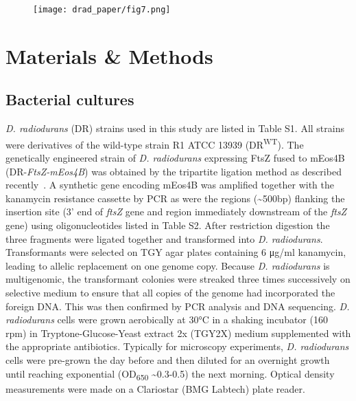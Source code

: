 \begin{figure}[ht]
    \centering
    \texttt{[image: drad\_paper/fig7.png]}
    \label{drad_fig7}
\end{figure}

\section{Materials \& Methods}

\subsection{Bacterial cultures}

\textit{D. radiodurans} (DR) strains used in this study are listed in Table S1.
All strains were derivatives of the wild-type strain R1 ATCC 13939 (DR\textsuperscript{WT}).
The genetically engineered strain of \textit{D. radiodurans} expressing FtsZ fused to mEos4B (DR-\textit{FtsZ-mEos4B}) was obtained by the tripartite ligation method as described recently~\cite{vauclareStressinducedNucleoidRemodeling2024}.
A synthetic gene encoding mEos4B was amplified together with the kanamycin resistance cassette by PCR as were the regions (\sim500bp) flanking the insertion site (3' end of \textit{ftsZ} gene and region immediately downstream of the \textit{ftsZ} gene) using oligonucleotides listed in Table S2.
After restriction digestion the three fragments were ligated together and transformed into \textit{D. radiodurans}.
Transformants were selected on TGY agar plates containing 6 μg/ml kanamycin, leading to allelic replacement on one genome copy.
Because \textit{D. radiodurans} is multigenomic, the transformant colonies were streaked three times successively on selective medium to ensure that all copies of the genome had incorporated the foreign DNA.
This was then confirmed by PCR analysis and DNA sequencing.
\textit{D. radiodurans} cells were grown aerobically at 30°C in a shaking incubator (160 rpm) in Tryptone-Glucose-Yeast extract 2x (TGY2X) medium supplemented with the appropriate antibiotics.
Typically for microscopy experiments, \textit{D. radiodurans} cells were pre-grown the day before and then diluted for an overnight growth until reaching exponential (OD\textsubscript{650} \sim0.3-0.5) the next morning.
Optical density measurements were made on a Clariostar (BMG Labtech) plate reader.


